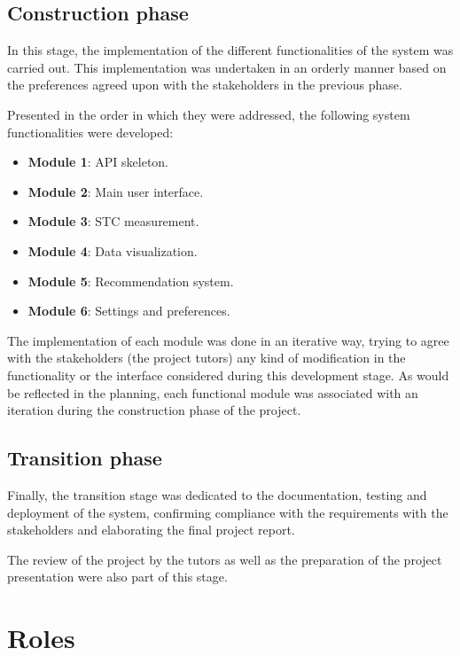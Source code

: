 \subsection{Construction phase}
\label{sec:constructionPhase}

In this stage, the implementation of the different functionalities of the system was carried out. This implementation was undertaken in an orderly manner based on the preferences agreed upon with the stakeholders in the previous phase.

Presented in the order in which they were addressed, the following system functionalities were developed:

\begin{itemize}
\item \textbf{Module 1}: API skeleton. 
\item \textbf{Module 2}: Main user interface.
\item \textbf{Module 3}: STC measurement.
\item \textbf{Module 4}: Data visualization.
\item \textbf{Module 5}: Recommendation system.
\item \textbf{Module 6}: Settings and preferences.
\end{itemize}

The implementation of each module was done in an iterative way, trying to agree with the stakeholders (the project tutors) any kind of modification in the functionality or the interface considered during this development stage. As would be reflected in the planning, each functional module was associated with an iteration during the construction phase of the project.

\subsection{Transition phase}
\label{sec:transitionPhase}

Finally, the transition stage was dedicated to the documentation, testing and deployment of the system, confirming compliance with the requirements with the stakeholders and elaborating the final project report.

The review of the project by the tutors as well as the preparation of the project presentation were also part of this stage.

\section{Roles}
\label{sec:roles}

